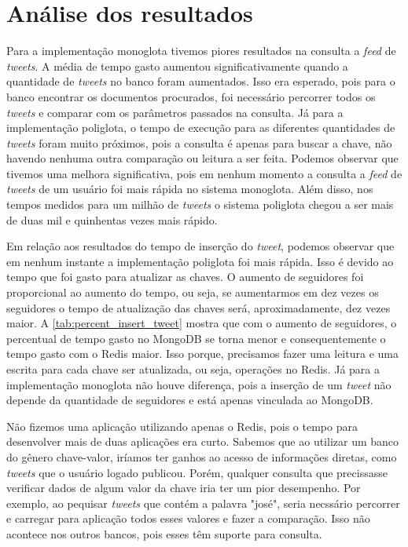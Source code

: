 


\section{Análise dos resultados}
\label{sec:resultEval}

Para a implementação monoglota tivemos piores resultados na consulta a \textit{feed} de \textit{tweets}. A média de tempo gasto aumentou significativamente quando a quantidade de \textit{tweets} no banco foram aumentados. Isso era esperado, pois para o banco encontrar os documentos procurados, foi necessário percorrer todos os \textit{tweets} e comparar com os parâmetros passados na consulta.
Já para a implementação poliglota, o tempo de execução para as diferentes quantidades de \textit{tweets} foram muito próximos, pois a consulta é apenas para buscar a chave, não havendo nenhuma outra comparação ou leitura a ser feita.
Podemos observar que tivemos uma melhora significativa, pois em nenhum momento a consulta a \textit{feed} de \textit{tweets} de um usuário foi mais rápida no sistema monoglota. Além disso, nos tempos medidos para um milhão de \textit{tweets} o sistema poliglota chegou a ser mais de duas mil e quinhentas vezes mais rápido.

Em relação aos resultados do tempo de inserção do \textit{tweet}, podemos observar que em nenhum instante a implementação poliglota foi mais rápida. Isso é devido ao tempo que foi gasto para atualizar as chaves. O aumento de seguidores foi proporcional ao aumento do tempo, ou seja, se aumentarmos em dez vezes os seguidores o tempo de atualização das chaves será, aproximadamente, dez vezes maior. A \autoref{tab:percent_insert_tweet} mostra que com o aumento de seguidores, o percentual de tempo gasto no MongoDB se torna menor e consequentemente o tempo gasto com o \ac{Redis} maior.
Isso porque, precisamos fazer uma leitura e uma escrita para cada chave ser atualizada, ou seja, operações no \ac{Redis}. Já para a implementação monoglota não houve diferença, pois a inserção de um \textit{tweet} não depende da quantidade de seguidores e está apenas vinculada ao MongoDB.

Não fizemos uma aplicação utilizando apenas o Redis, pois o tempo para desenvolver mais de duas aplicações era curto. Sabemos que ao utilizar um banco do gênero chave-valor, iríamos ter ganhos ao acesso de informações diretas, como \textit{tweets} que o usuário logado publicou. Porém, qualquer consulta que precissasse verificar dados de algum valor da chave iria ter um pior desempenho. Por exemplo, ao pequisar \textit{tweets} que contém a palavra "josé", seria necssário percorrer e carregar para aplicação todos esses valores e fazer a comparação. Isso não acontece nos outros bancos, pois esses têm suporte para consulta.


